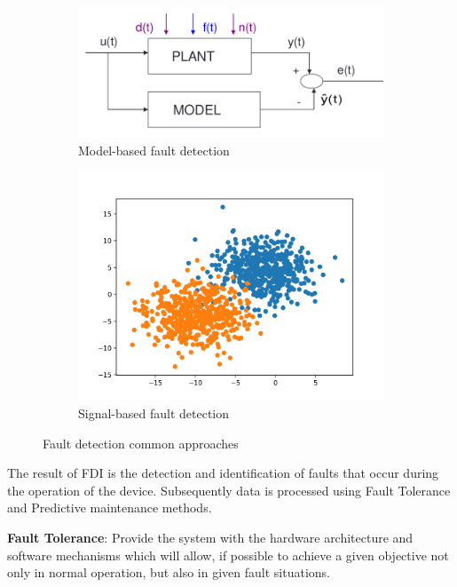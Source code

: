 \documentclass[class=article, crop=false]{standalone}
\begin{document}
\begin{figure}[h]
    \centering

\begin{subfigure}{0.5\textwidth}
    \includegraphics[width=0.9\linewidth]{model_based.png}
    \caption{Model-based fault detection}
    \label{fig:model_based}
\end{subfigure}%
\begin{subfigure}{0.5\textwidth}
    \includegraphics[width=0.9\linewidth]{signal_based.png}
    \caption{Signal-based fault detection}
    \label{fig:signal_based}
\end{subfigure}

\caption{Fault detection common approaches}
\label{fig:fault_detection}

\end{figure}

The result of FDI is the detection and identification of faults that occur
during the operation of the device. Subsequently data is processed using
Fault Tolerance and Predictive maintenance methods.

\textbf{Fault Tolerance}: Provide the system with the hardware architecture and
  software mechanisms which will allow, if possible to achieve a given
  objective not only in normal operation, but also in given fault
  situations.
\end{document}
